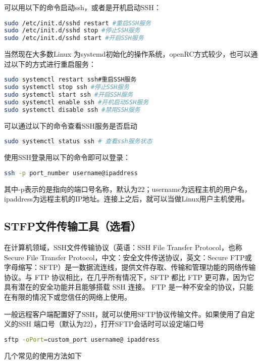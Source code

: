 \documentclass[lang=cn,a4paper,newtx]{elegantpaper}
\begin{document}
可以用以下的命令启动ssh，或者是开机启动SSH：
\begin{lstlisting}[language=bash]
sudo /etc/init.d/sshd restart #重启SSH服务
sudo /etc/init.d/sshd stop #停止SSH服务
sudo /etc/init.d/sshd start #开启SSH服务
\end{lstlisting}

当然现在大多数Linux 为systemd初始化的操作系统，openRC方式较少，也可以通过以下的方式进行重启服务：

\begin{lstlisting}[language=bash]
sudo systemctl restart ssh#重启SSH服务
sudo systemctl stop ssh #停止SSH服务
sudo systemctl start ssh #开启SSH服务
sudo systemctl enable ssh #开机启动SSH服务
sudo systemctl disable ssh #禁用SSH服务
\end{lstlisting}

可以通过以下的命令查看SSH服务是否启动
\begin{lstlisting}[language=bash]
sudo systemctl status ssh # 查看ssh服务状态
\end{lstlisting}

使用SSH登录用以下的命令即可以登录：
\begin{lstlisting}[language=bash]
ssh -p port_number username@ipaddress
\end{lstlisting}
其中-p表示的是指向的端口号名称，默认为22；username为远程主机的用户名，ipaddress为远程主机的IP地址。连接上之后，就可以当做Linux用户主机使用。


\subsection{STFP文件传输工具（选看）}
在计算机领域，SSH文件传输协议（英语：SSH File Transfer Protocol，也称Secure File Transfer Protocol，中文：安全文件传送协议，英文：Secure FTP或字母缩写：SFTP）是一数据流连线，提供文件存取、传输和管理功能的网络传输协议。与 FTP 协议相比，在几乎所有情况下，SFTP 都比 FTP 更可靠，因为它具有潜在的安全功能并且能够搭载 SSH 连接。 FTP 是一种不安全的协议，只能在有限的情况下或您信任的网络上使用。

一般远程客户端配置好了SSH，就可以使用SFTP协议传输文件。如果使用了自定义的SSH 端口号（默认为22），打开SFTP会话时可以设定端口号
\begin{lstlisting}[language=bash]
sftp -oPort=custom_port username@ ipaddress
\end{lstlisting}

几个常见的使用方法如下
\end{document}
